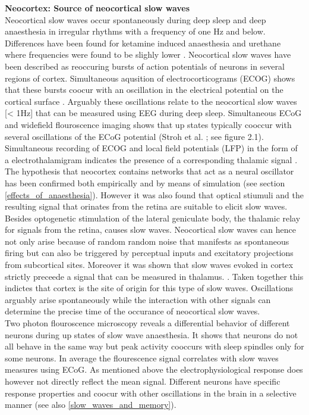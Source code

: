 \textbf{Neocortex: Source of neocortical slow waves}\\
Neocortical slow waves occur spontaneously during deep sleep and deep anaesthesia in irregular rhythms with a frequency of one Hz and below. Differences have been found for ketamine induced anaesthesia and urethane where frequencies were found to be slighly lower \parencite{steriade1993novel}. Neocortical slow waves have been described as reoccuring bursts of action potentials of neurons in several regions of cortex. Simultaneous aqusition of electrocorticograms (ECOG) shows that these bursts coocur with an oscillation in the electrical potential on the cortical surface \parencite{steriade1993novel}. Arguably these oscillations relate to the neocortical slow waves [< 1Hz] that can be measured using EEG during deep sleep. Simultaneous ECoG and widefield flouroscence imaging shows that up states typically cooccur with several oscillations of the ECoG potential (Stroh et al. \cite*{stroh2013making}; see figure 2.1). \\
Simultaneous recording of ECOG and local field potentials (LFP) in the form of a electrothalamigram indicates the presence of a corresponding thalamic signal \parencite{steriade1993novel}. The hypothesis that neocortex contains networks that act as a neural oscillator has been confirmed both empirically and by means of simulation (see section \ref{effects_of_anaesthesia}). However it was also found that optical stiumuli and the resulting signal that orinates from the retina are suitable to elicit slow waves. Besides optogenetic stimulation of the lateral geniculate body, the thalamic relay for signals from the retina, causes slow waves. Neocortical slow waves can hence not only arise because of random random noise that manifests as spontaneous firing but can also be triggered by perceptual inputs and excitatory projections from subcortical sites. Moreover it was shown that slow waves evoked in cortex strictly preceede a signal that can be measured in thalamus. \parencite{stroh2013making}. Taken together this indictes that cortex is the site of origin for this type of slow waves. Oscillations arguably arise spontaneously while the interaction with other signals can determine the precise time of the occurance of neocortical slow waves.\\
Two photon flouroscence microscopy reveals a differential behavior of different neurons during up states of slow wave anaesthesia. It shows that neurons do not all behave in the same way but peak activity cooccurs with sleep spindles only for some neurons. In average the flourescence signal correlates with slow waves measures using ECoG. As mentioned above the electrophysiological response does however not directly reflect the mean signal. Different neurons have specific response properties and coocur with other oscillations in the brain in a selective manner (see also \ref{slow_waves_and_memory}).\\


